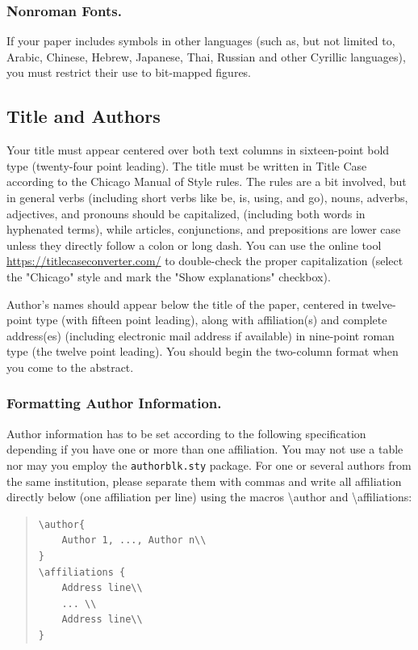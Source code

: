 \subsubsection{Nonroman Fonts.}
If your paper includes symbols in other languages (such as, but not limited to, Arabic, Chinese, Hebrew, Japanese, Thai, Russian and other Cyrillic languages), you must restrict their use to bit-mapped figures.

\subsection{Title and Authors}
Your title must appear centered over both text columns in sixteen-point bold type (twenty-four point leading). The title must be written in Title Case according to the Chicago Manual of Style rules. The rules are a bit involved, but in general verbs (including short verbs like be, is, using, and go), nouns, adverbs, adjectives, and pronouns should be capitalized, (including both words in hyphenated terms), while articles, conjunctions, and prepositions are lower case unless they directly follow a colon or long dash. You can use the online tool \url{https://titlecaseconverter.com/} to double-check the proper capitalization (select the "Chicago" style and mark the "Show explanations" checkbox).

Author's names should appear below the title of the paper, centered in twelve-point type (with fifteen point leading), along with affiliation(s) and complete address(es) (including electronic mail address if available) in nine-point roman type (the twelve point leading). You should begin the two-column format when you come to the abstract.

\subsubsection{Formatting Author Information.}
Author information has to be set according to the following specification depending if you have one or more than one affiliation. You may not use a table nor may you employ the \texttt{authorblk.sty} package. For one or several authors from the same institution, please separate them with commas and write all affiliation directly below (one affiliation per line) using the macros \textbackslash author and \textbackslash affiliations:

\begin{quote}\begin{scriptsize}\begin{verbatim}
\author{
    Author 1, ..., Author n\\
}
\affiliations {
    Address line\\
    ... \\
    Address line\\
}
\end{verbatim}\end{scriptsize}\end{quote}


